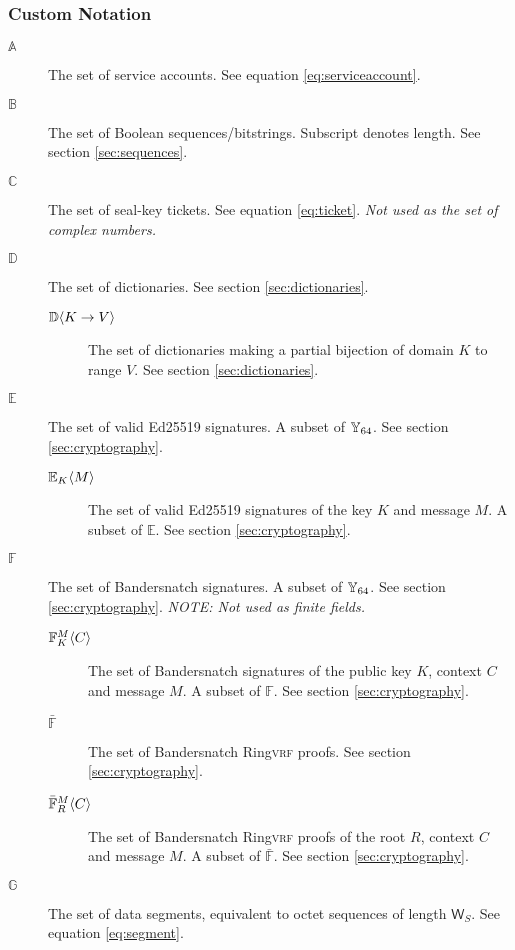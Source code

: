 \subsubsection{Custom Notation}
\begin{description}
  \item[$\mathbb{A}$] The set of service accounts. See equation \ref{eq:serviceaccount}.
  \item[$\mathbb{B}$] The set of Boolean sequences/bitstrings. Subscript denotes length. See section \ref{sec:sequences}.
  \item[$\mathbb{C}$] The set of seal-key tickets. See equation \ref{eq:ticket}. \emph{Not used as the set of complex numbers.}
  \item[$\mathbb{D}$] The set of dictionaries. See section \ref{sec:dictionaries}.
  \begin{description}
    \item[$\dict{K}{V}$] The set of dictionaries making a partial bijection of domain $K$ to range $V$. See section \ref{sec:dictionaries}.
  \end{description}
  \item[$\mathbb{E}$] The set of valid Ed25519 signatures. A subset of $\Y_{64}$. See section \ref{sec:cryptography}.
  \begin{description}
    \item[$\sig{K}{M}$] The set of valid Ed25519 signatures of the key $K$ and message $M$. A subset of $\mathbb{E}$. See section \ref{sec:cryptography}.
  \end{description}
  \item[$\mathbb{F}$] The set of Bandersnatch signatures. A subset of $\Y_{64}$. See section \ref{sec:cryptography}. \emph{NOTE: Not used as finite fields.}
  \begin{description}
    \item[$\bandersig{K}{C}{M}$] The set of Bandersnatch signatures of the public key $K$, context $C$ and message $M$. A subset of $\mathbb{F}$. See section \ref{sec:cryptography}.
    \item[$\bar{\mathbb{F}}$] The set of Bandersnatch Ring\textsc{vrf} proofs. See section \ref{sec:cryptography}.
    \item[$\bandersnatch{R}{C}{M}$] The set of Bandersnatch Ring\textsc{vrf} proofs of the root $R$, context $C$ and message $M$. A subset of $\bar{\mathbb{F}}$. See section \ref{sec:cryptography}.
  \end{description}
  \item[$\mathbb{G}$] The set of data segments, equivalent to octet sequences of length $\mathsf{W}_S$. See equation \ref{eq:segment}.

\end{description}

